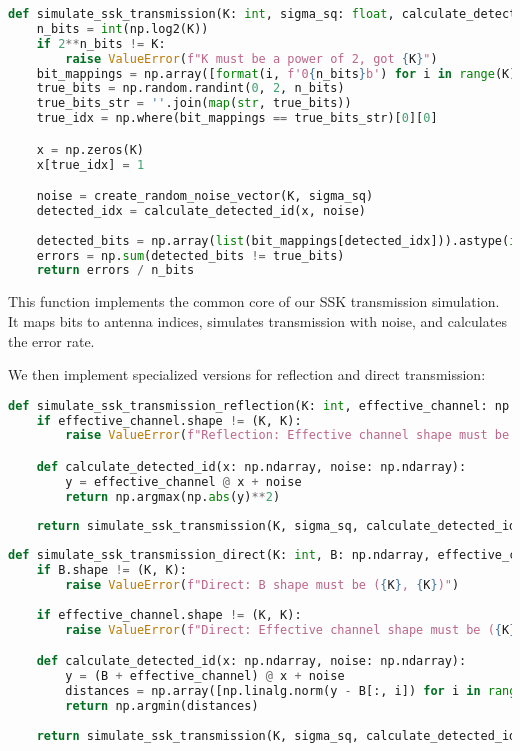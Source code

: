 \begin{lstlisting}[language=python, caption={SSK Transmission Simulation}]
def simulate_ssk_transmission(K: int, sigma_sq: float, calculate_detected_id: Callable[[np.ndarray, np.ndarray], float]):
    n_bits = int(np.log2(K))
    if 2**n_bits != K:
        raise ValueError(f"K must be a power of 2, got {K}")
    bit_mappings = np.array([format(i, f'0{n_bits}b') for i in range(K)])    
    true_bits = np.random.randint(0, 2, n_bits)
    true_bits_str = ''.join(map(str, true_bits))
    true_idx = np.where(bit_mappings == true_bits_str)[0][0]

    x = np.zeros(K)
    x[true_idx] = 1

    noise = create_random_noise_vector(K, sigma_sq)
    detected_idx = calculate_detected_id(x, noise)
    
    detected_bits = np.array(list(bit_mappings[detected_idx])).astype(int)
    errors = np.sum(detected_bits != true_bits)
    return errors / n_bits
\end{lstlisting}

\newpage
This function implements the common core of our SSK transmission simulation. It maps bits to antenna indices, simulates transmission with noise, and calculates the error rate.

We then implement specialized versions for reflection and direct transmission:

\begin{lstlisting}[language=python, caption={SSK Transmission with Reflection}]
def simulate_ssk_transmission_reflection(K: int, effective_channel: np.ndarray, sigma_sq: float):
    if effective_channel.shape != (K, K):
        raise ValueError(f"Reflection: Effective channel shape must be ({K}, {K})")

    def calculate_detected_id(x: np.ndarray, noise: np.ndarray):
        y = effective_channel @ x + noise
        return np.argmax(np.abs(y)**2)
    
    return simulate_ssk_transmission(K, sigma_sq, calculate_detected_id)
\end{lstlisting}

\begin{lstlisting}[language=python, caption={SSK Transmission with Direct Path}]
def simulate_ssk_transmission_direct(K: int, B: np.ndarray, effective_channel: np.ndarray, sigma_sq: float):
    if B.shape != (K, K):
        raise ValueError(f"Direct: B shape must be ({K}, {K})")
    
    if effective_channel.shape != (K, K):
        raise ValueError(f"Direct: Effective channel shape must be ({K}, {K})")

    def calculate_detected_id(x: np.ndarray, noise: np.ndarray):
        y = (B + effective_channel) @ x + noise
        distances = np.array([np.linalg.norm(y - B[:, i]) for i in range(B.shape[1])])
        return np.argmin(distances)
    
    return simulate_ssk_transmission(K, sigma_sq, calculate_detected_id)
\end{lstlisting}

